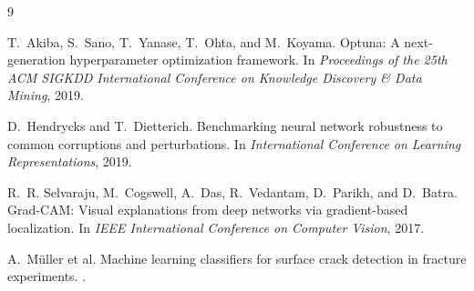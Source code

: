 \documentclass[11pt]{article}
\begin{document}
\begin{thebibliography}{9}

T.~Akiba, S.~Sano, T.~Yanase, T.~Ohta, and M.~Koyama.
\newblock Optuna: A next-generation hyperparameter optimization framework.
\newblock In \emph{Proceedings of the 25th ACM SIGKDD International Conference on Knowledge Discovery \& Data Mining}, 2019.

D.~Hendrycks and T.~Dietterich.
\newblock Benchmarking neural network robustness to common corruptions and perturbations.
\newblock In \emph{International Conference on Learning Representations}, 2019.

R.~R. Selvaraju, M.~Cogswell, A.~Das, R.~Vedantam, D.~Parikh, and D.~Batra.
\newblock Grad-CAM: Visual explanations from deep networks via gradient-based localization.
\newblock In \emph{IEEE International Conference on Computer Vision}, 2017.

A.~M\"uller et al.
\newblock Machine learning classifiers for surface crack detection in fracture experiments.
.

\end{thebibliography}
\end{document}

